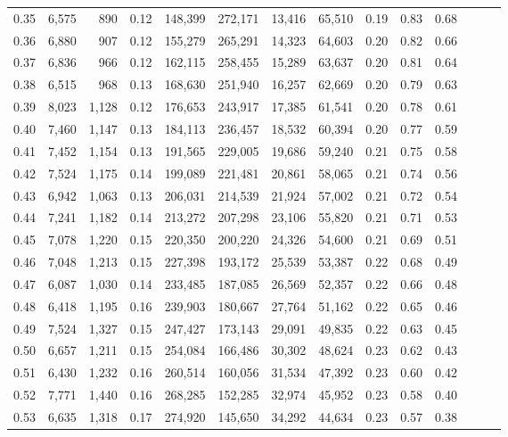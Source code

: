 \begin{tabular}{rrrrrrrrrrrrrr}
0.35 &  6,575 &    890 &  0.12 &  148,399 &  272,171 &  13,416 &  65,510 &  0.19 &  0.83 &      0.68 \\
0.36 &  6,880 &    907 &  0.12 &  155,279 &  265,291 &  14,323 &  64,603 &  0.20 &  0.82 &      0.66 \\
0.37 &  6,836 &    966 &  0.12 &  162,115 &  258,455 &  15,289 &  63,637 &  0.20 &  0.81 &      0.64 \\
0.38 &  6,515 &    968 &  0.13 &  168,630 &  251,940 &  16,257 &  62,669 &  0.20 &  0.79 &      0.63 \\
0.39 &  8,023 &  1,128 &  0.12 &  176,653 &  243,917 &  17,385 &  61,541 &  0.20 &  0.78 &      0.61 \\
0.40 &  7,460 &  1,147 &  0.13 &  184,113 &  236,457 &  18,532 &  60,394 &  0.20 &  0.77 &      0.59 \\
0.41 &  7,452 &  1,154 &  0.13 &  191,565 &  229,005 &  19,686 &  59,240 &  0.21 &  0.75 &      0.58 \\
0.42 &  7,524 &  1,175 &  0.14 &  199,089 &  221,481 &  20,861 &  58,065 &  0.21 &  0.74 &      0.56 \\
0.43 &  6,942 &  1,063 &  0.13 &  206,031 &  214,539 &  21,924 &  57,002 &  0.21 &  0.72 &      0.54 \\
0.44 &  7,241 &  1,182 &  0.14 &  213,272 &  207,298 &  23,106 &  55,820 &  0.21 &  0.71 &      0.53 \\
0.45 &  7,078 &  1,220 &  0.15 &  220,350 &  200,220 &  24,326 &  54,600 &  0.21 &  0.69 &      0.51 \\
0.46 &  7,048 &  1,213 &  0.15 &  227,398 &  193,172 &  25,539 &  53,387 &  0.22 &  0.68 &      0.49 \\
0.47 &  6,087 &  1,030 &  0.14 &  233,485 &  187,085 &  26,569 &  52,357 &  0.22 &  0.66 &      0.48 \\
0.48 &  6,418 &  1,195 &  0.16 &  239,903 &  180,667 &  27,764 &  51,162 &  0.22 &  0.65 &      0.46 \\
0.49 &  7,524 &  1,327 &  0.15 &  247,427 &  173,143 &  29,091 &  49,835 &  0.22 &  0.63 &      0.45 \\
0.50 &  6,657 &  1,211 &  0.15 &  254,084 &  166,486 &  30,302 &  48,624 &  0.23 &  0.62 &      0.43 \\
0.51 &  6,430 &  1,232 &  0.16 &  260,514 &  160,056 &  31,534 &  47,392 &  0.23 &  0.60 &      0.42 \\
0.52 &  7,771 &  1,440 &  0.16 &  268,285 &  152,285 &  32,974 &  45,952 &  0.23 &  0.58 &      0.40 \\
0.53 &  6,635 &  1,318 &  0.17 &  274,920 &  145,650 &  34,292 &  44,634 &  0.23 &  0.57 &      0.38 \\

\end{tabular}
